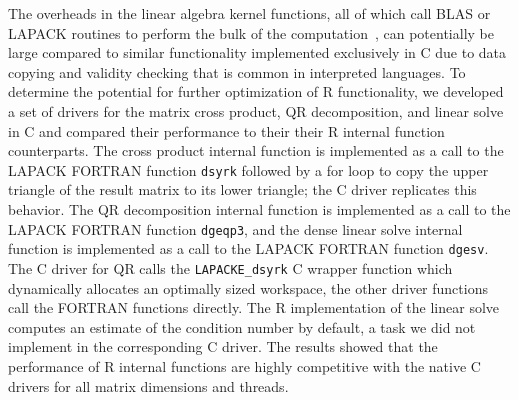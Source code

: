 The overheads in the linear algebra kernel functions, all of which call BLAS or LAPACK
routines to perform the bulk of the computation~\cite{cran:Rmanuals}, can potentially be
large compared to similar functionality implemented exclusively in C due to data copying
and validity checking that is common in interpreted languages. To determine the potential
for further optimization of R functionality, we developed a set of drivers for the matrix
cross product, QR decomposition, and linear solve in C and compared their performance to
their their R internal function counterparts. The cross product internal function is
implemented as a call to the LAPACK FORTRAN function \texttt{dsyrk} followed by a for loop
to copy the upper triangle of the result matrix to its lower triangle; the C driver
replicates this behavior. The QR decomposition internal function is implemented as a call
to the LAPACK FORTRAN function \texttt{dgeqp3}, and the dense linear solve internal
function is implemented as a call to the LAPACK FORTRAN function \texttt{dgesv}. The C
driver for QR calls the \texttt{LAPACKE\_dsyrk} C wrapper function which dynamically
allocates an optimally sized workspace, the other driver functions call the FORTRAN
functions directly. The R implementation of the linear solve computes an estimate of the
condition number by default, a task we did not implement in the corresponding C driver.
The results showed that the performance of R internal functions are highly competitive
with the native C drivers for all matrix dimensions and threads.




